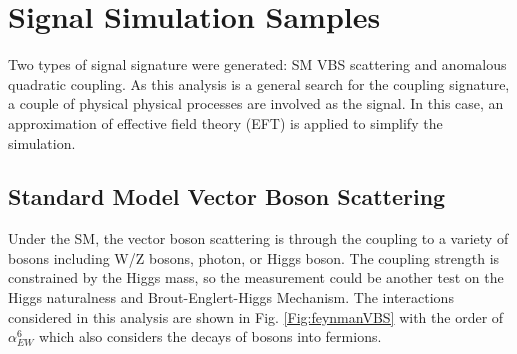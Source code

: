 \section{Signal Simulation Samples}
Two types of signal signature were generated: SM VBS scattering and anomalous quadratic coupling. As this analysis is a general search for the coupling signature, a couple of physical physical processes are involved as the signal. In this case, an approximation of effective field theory (EFT) is applied to simplify the simulation. 

\subsection{Standard Model Vector Boson Scattering}
Under the SM, the vector boson scattering is through the coupling to a variety of bosons including W/Z bosons, photon, or Higgs boson. The coupling strength is constrained by the Higgs mass, so the measurement could be another test on the Higgs naturalness and  Brout-Englert-Higgs Mechanism\cite{PhysRevD.7.3111}. The interactions considered in this analysis are shown in Fig. \ref{Fig:feynmanVBS}  with the order of $\alpha_{EW}^6$ which also considers the decays of bosons into fermions. 

